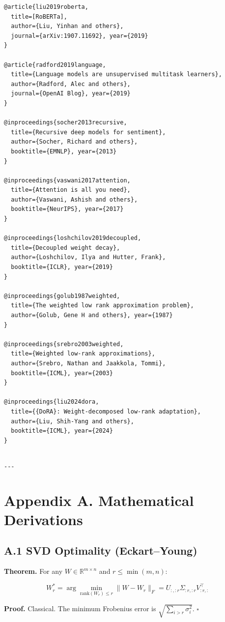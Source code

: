 \begin{lstlisting}
@article{liu2019roberta,
  title=[RoBERTa],
  author={Liu, Yinhan and others},
  journal={arXiv:1907.11692}, year={2019}
}

@article{radford2019language,
  title={Language models are unsupervised multitask learners},
  author={Radford, Alec and others},
  journal={OpenAI Blog}, year={2019}
}

@inproceedings{socher2013recursive,
  title={Recursive deep models for sentiment},
  author={Socher, Richard and others},
  booktitle={EMNLP}, year={2013}
}

@inproceedings{vaswani2017attention,
  title={Attention is all you need},
  author={Vaswani, Ashish and others},
  booktitle={NeurIPS}, year={2017}
}

@inproceedings{loshchilov2019decoupled,
  title={Decoupled weight decay},
  author={Loshchilov, Ilya and Hutter, Frank},
  booktitle={ICLR}, year={2019}
}

@inproceedings{golub1987weighted,
  title={The weighted low rank approximation problem},
  author={Golub, Gene H and others}, year={1987}
}

@inproceedings{srebro2003weighted,
  title={Weighted low-rank approximations},
  author={Srebro, Nathan and Jaakkola, Tommi},
  booktitle={ICML}, year={2003}
}

@inproceedings{liu2024dora,
  title={{DoRA}: Weight-decomposed low-rank adaptation},
  author={Liu, Shih-Yang and others},
  booktitle={ICML}, year={2024}
}
\end{lstlisting}
\begin{lstlisting}

---
\end{lstlisting}


\section{Appendix A. Mathematical Derivations}

\subsection{A.1 SVD Optimality (Eckart--Young)}

\textbf{Theorem.} For any $W \in \mathbb{R}^{m \times n}$ and $r \leq \min(m, n)$:

\[
W_r^* = \arg\min_{\text{rank}(W_r) \leq r} \|W - W_r\|_F = U_{:, :r} \Sigma_{:r, :r} V_{:r, :}^\top
\tag{A.1}
\]

\textbf{Proof.} Classical. The minimum Frobenius error is $\sqrt{\sum_{i > r} \sigma_i^2}$. 
$\square$

